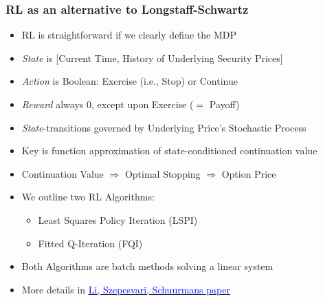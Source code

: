 \documentclass[handout]{beamer}
\begin{document}
\begin{frame}
\frametitle{RL as an alternative to Longstaff-Schwartz}
\pause
\begin{itemize}[<+->]
\item RL is straightforward if we clearly define the MDP
\item {\em State} is [Current Time, History of Underlying Security Prices]
\item {\em Action} is Boolean: Exercise (i.e., Stop) or Continue
\item {\em Reward} always 0, except upon Exercise ($=$ Payoff)
\item {\em State}-transitions governed by Underlying Price's Stochastic Process
\item Key is function approximation of state-conditioned continuation value
\item Continuation Value $\Rightarrow$ Optimal Stopping $\Rightarrow$ Option Price
\item We outline two RL Algorithms:
\begin{itemize}
\item Least Squares Policy Iteration (LSPI)
\item Fitted Q-Iteration (FQI)
\end{itemize}
\item Both Algorithms are batch methods solving a linear system
\item More details in \href{http://proceedings.mlr.press/v5/li09d/li09d.pdf}{\underline{\textcolor{blue}{Li, Szepesvari, Schuurmans paper}}}
\end{itemize}
\end{frame}
\end{document}
